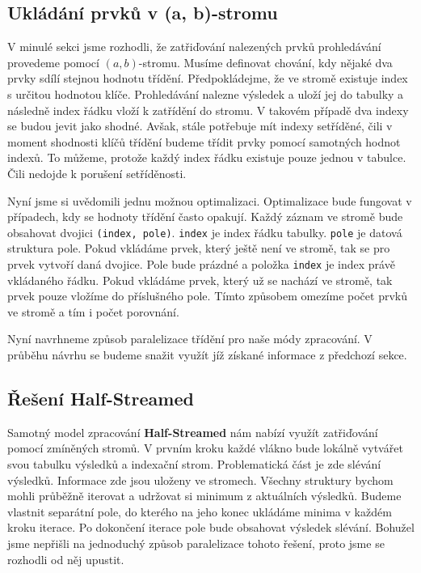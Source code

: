\subsection{Ukládání prvků v (a, b)-stromu} \label{anal.improvement.orderby.storeindex}

V minulé sekci jsme rozhodli, že zatřiďování nalezených prvků prohledávání provedeme pomocí $(a, b)$-stromu.
Musíme definovat chování, kdy nějaké dva prvky sdílí stejnou hodnotu třídění.
Předpokládejme, že ve stromě existuje index s určitou hodnotou klíče.
Prohledávání nalezne výsledek a uloží jej do tabulky a následně index řádku vloží k zatřídění do stromu.
V takovém případě dva indexy se budou jevit jako shodné.
Avšak, stále potřebuje mít indexy setříděné, čili v moment shodnosti klíčů třídění budeme třídit prvky pomocí samotných hodnot indexů.
To můžeme, protože každý index řádku existuje pouze jednou v tabulce.
Čili nedojde k porušení setříděnosti.

Nyní jsme si uvědomili jednu možnou optimalizaci.
Optimalizace bude fungovat v případech, kdy se hodnoty třídění často opakují.
Každý záznam ve stromě bude obsahovat dvojici \texttt{(index, pole)}.
\texttt{index} je index řádku tabulky.
\texttt{pole} je datová struktura pole.
Pokud vkládáme prvek, který ještě není ve stromě, tak se pro prvek vytvoří daná dvojice.
Pole bude prázdné a položka \texttt{index} je index právě vkládaného řádku.
Pokud vkládáme prvek, který už se nachází ve stromě, tak prvek pouze vložíme do příslušného pole.
Tímto způsobem omezíme počet prvků ve stromě a tím i počet porovnání.

Nyní navrhneme způsob paralelizace třídění pro naše módy zpracování.
V průběhu návrhu se budeme snažit využít jíž získané informace z předchozí sekce.

\subsection{Řešení Half-Streamed} \label{anal.improvement.orderby.halfstreamed}

Samotný model zpracování \textbf{Half-Streamed} nám nabízí využít zatřiďování pomocí zmíněných stromů.
V prvním kroku každé vlákno bude lokálně vytvářet svou tabulku výsledků a indexační strom.
Problematická část je zde slévání výsledků.
Informace zde jsou uloženy ve stromech.
Všechny struktury bychom mohli průběžně iterovat a udržovat si minimum z aktuálních výsledků.
Budeme vlastnit separátní pole, do kterého na jeho konec ukládáme minima v každém kroku iterace.
Po dokončení iterace pole bude obsahovat výsledek slévání.
Bohužel jsme nepřišli na jednoduchý způsob paralelizace tohoto řešení, proto jsme se rozhodli od něj upustit.

